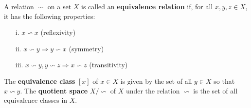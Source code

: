 \begin{definition} 
    A relation $\backsim$ on a set $X$ is called an \textbf{equivalence
    relation} if, for all $x,y,z \in X$, it has the following properties:
    \begin{itemize}[noitemsep,topsep=0pt]
        \item[i.] $x \backsim x$ (reflexivity)
        \item[ii.] $x \backsim y \Rightarrow y \backsim x$ (symmetry)
        \item[iii.] $x \backsim y, y \backsim z \Rightarrow x \backsim z$
        (transitivity)
    \end{itemize}
    The \textbf{equivalence class} $[x]$ of $x \in X$ is given by the set of
    all $y \in X$ so that $x \backsim y$.
    The \textbf{quotient space} $X \big/ {\backsim}$ of $X$ under the relation
    $\backsim$ is the set of all equivalence classes in $X$. 
\end{definition}

